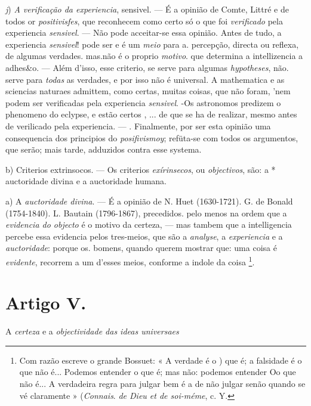 \emph{j}) \emph{A verificação da experiencia}, sensivel. --- É a opinião de Comte, Littré e de todos or \emph{positivisfes}, que reconhecem como certo só o que foi \emph{verificado} pela experiencia \emph{sensivel}. --- Não pode acceitar-se essa opinião. Antes de tudo, a experiencia \emph{sensivel}! pode ser e é um \emph{meio} para a. percepção, directa ou reflexa, de algumas verdades. mas.não é o proprio \emph{motivo}. que determina a intellizencia a adhes\&o. --- Além d'isso, esse criterio, se serve para algumas \emph{hypotheses}, não. serve para \emph{todas} as verdades, e por isso não é universal. A mathematica e as sciencias naturaes admittem, como certas, muitas coisas, que não foram, 'nem podem ser verificadas pela experiencia \emph{sensivel}. -Os astronomos predizem o phenomeno do eclypse, e estão certos , ... de que se ha de realizar, mesmo antes de verilicado pela experiencia. --- . Finalmente, por ser esta opinião uma consequencia dos principios do \emph{posifivismoy}; refüta-se com todos os argumentos, que serão; mais tarde, adduzidos contra esse systema.

b) Criterios extrinsocos. --- Os criterios \emph{exírinsecos}, ou \emph{objectivos}, são: a * auctoridade divina e a auctoridade humana.

a) A \emph{auctoridade divina}. --- É a opinião de N. Huet (1630-1721). G. de Bonald (1754-1840). L. Bautain (1796-1867), precedidos. pelo menos na ordem   que a \emph{evidencia do objecto} é o motivo da certeza, --- mas tambem que a intelligencia percebe essa evidencia pelos tres-meios, que são a \emph{analyse}, a \emph{experiencia} e a \emph{auctoridade}: porque os. bomens, quando querem mostrar que: uma coisa é \emph{evidente}, recorrem a um d'esses meios, conforme a indole da coisa \footnote{Com razão escreve o grande Bossuet: « A verdade é o ) que é; a falsidade é o que não é... Podemos entender o que é; mas não: podemos entender Oo que não é... A verdadeira regra para julgar bem é a de não julgar senão quando se vé claramente » (\emph{Connais}. \emph{de Dieu et de soi-méme}, c. Y.}.


\section*{Artigo V.}

A \emph{certeza} e a \emph{objectividade das ideas universaes}


